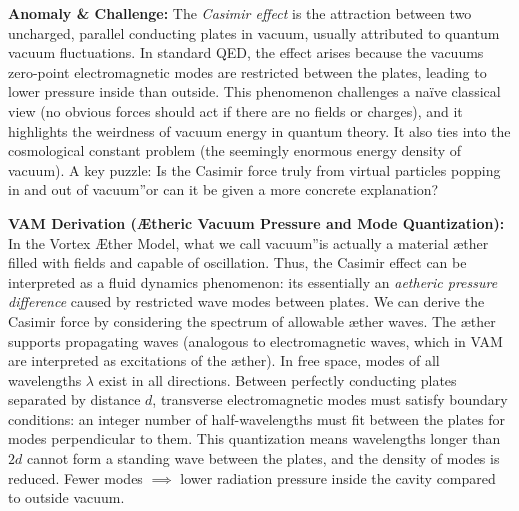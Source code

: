 \documentclass[a4paper, aps,preprint,superscriptaddress, 12pt]{revtex4}
\begin{document}
\textbf{Anomaly \& Challenge: } The \textit{Casimir effect} is the attraction between two uncharged, parallel conducting plates in vacuum, usually attributed to quantum vacuum fluctuations. In standard QED, the effect arises because the vacuum\rqs s zero-point electromagnetic modes are restricted between the plates, leading to lower pressure inside than outside. This phenomenon challenges a naïve classical view (no obvious forces should act if there are no fields or charges), and it highlights the weirdness of vacuum energy in quantum theory. It also ties into the cosmological constant problem (the seemingly enormous energy density of vacuum). A key puzzle: Is the Casimir force truly from \grqq virtual particles popping in and out of vacuum\textquotedblright or can it be given a more concrete explanation?


\textbf{VAM Derivation (Ætheric Vacuum Pressure and Mode Quantization):} In the Vortex Æther Model, what we call \grqq vacuum\textquotedblright is actually a material æther filled with fields and capable of oscillation. Thus, the Casimir effect can be interpreted as a fluid dynamics phenomenon: it\rqs s essentially an \textit{aetheric pressure difference} caused by restricted wave modes between plates. We can derive the Casimir force by considering the spectrum of allowable æther waves. The æther supports propagating waves (analogous to electromagnetic waves, which in VAM are interpreted as excitations of the æther). In free space, modes of all wavelengths $\lambda$ exist in all directions. Between perfectly conducting plates separated by distance $d$, transverse electromagnetic modes must satisfy boundary conditions: an integer number of half-wavelengths must fit between the plates for modes perpendicular to them. This quantization means wavelengths longer than $2d$ cannot form a standing wave between the plates, and the density of modes is reduced. Fewer modes $\implies$ lower radiation pressure inside the cavity compared to outside vacuum.
\end{document}
